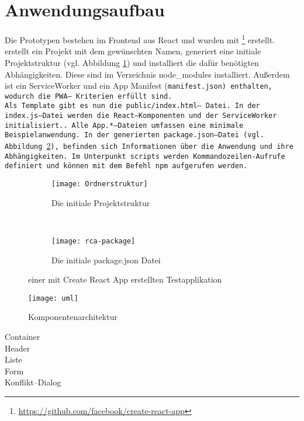 \section{Anwendungsaufbau}
Die Prototypen bestehen im Frontend aus React und wurden mit \footnote{\url{https://github.com/facebook/create-react-app}} erstellt.  erstellt ein Projekt mit dem gewünschten Namen, generiert eine initiale Projektstruktur (vgl. Abbildung \ref{fig:init}) und installiert die dafür benötigten Abhängigkeiten. Diese sind im Verzeichnis node\_modules installiert.
Außerdem ist ein ServiceWorker und ein App Manifest (\tt{manifest.json}) enthalten, wodurch die \gls{PWA}-- Kriterien erfüllt sind.\\
Als Template gibt es nun die \tt{public/index.html}-- Datei. In der \tt{index.js}--Datei werden die React--Komponenten und der ServiceWorker initialisiert.. Alle \tt{App.*}--Dateien umfassen eine minimale Beispielanwendung.
In der generierten \tt{package.json}--Datei (vgl. Abbildung \ref{fig:init2}), befinden sich Informationen über die Anwendung und ihre Abhängigkeiten. Im Unterpunkt \tt{scripts} werden Kommandozeilen-Aufrufe definiert und können mit dem Befehl \tt{npm} aufgerufen werden.
\begin{figure}[H]
  \centering
  \begin{subfigure}[t]{0.45\textwidth}
          \texttt{[image: Ordnerstruktur]}
          \caption{Die initiale Projektstruktur}
          \label{fig:init}
  \end{subfigure}
  ~ 
  \begin{subfigure}[t]{0.45\textwidth}
          \texttt{[image: rca-package]}
          \caption{Die initiale package.json Datei}
          \label{fig:init2}
  \end{subfigure}
  \grayRule
  \caption[Create React App: initiale Testapplikation]{einer mit Create React App erstellten Testapplikation}
  \label{fig:create-react-app}
\end{figure}
%
%
%
%
%
\begin{figure}[H]
  \texttt{[image: uml]}
  \grayRule
  \caption{Komponentenarchitektur}
  \label{fig:uml}
\end{figure}

Container\\
Header\\
Liste\\
Form\\
Konflikt--Dialog\\

